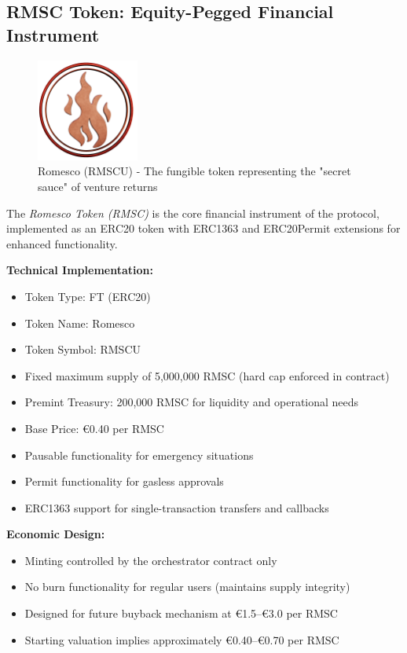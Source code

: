 \documentclass[conference]{IEEEtran}
\begin{document}
\subsection{RMSC Token: Equity-Pegged Financial Instrument}

\begin{figure}[ht]
\centering
\includegraphics[width=0.3\textwidth]{rmsc_logo.png}
\caption{Romesco (RMSCU) - The fungible token representing the "secret sauce" of venture returns}
\label{fig:rmsc-logo}
\end{figure}

The \textit{Romesco Token (RMSC)} is the core financial instrument of the protocol, implemented as an ERC20 token with ERC1363 and ERC20Permit extensions for enhanced functionality.

\textbf{Technical Implementation:}
\begin{itemize}
    \item Token Type: FT (ERC20)
    \item Token Name: Romesco
    \item Token Symbol: RMSCU
    \item Fixed maximum supply of 5,000,000 RMSC (hard cap enforced in contract)
    \item Premint Treasury: 200,000 RMSC for liquidity and operational needs
    \item Base Price: €0.40 per RMSC
    \item Pausable functionality for emergency situations
    \item Permit functionality for gasless approvals
    \item ERC1363 support for single-transaction transfers and callbacks
\end{itemize}

\textbf{Economic Design:}
\begin{itemize}
    \item Minting controlled by the orchestrator contract only
    \item No burn functionality for regular users (maintains supply integrity)
    \item Designed for future buyback mechanism at €1.5–€3.0 per RMSC
    \item Starting valuation implies approximately €0.40–€0.70 per RMSC
\end{itemize}
\end{document}
